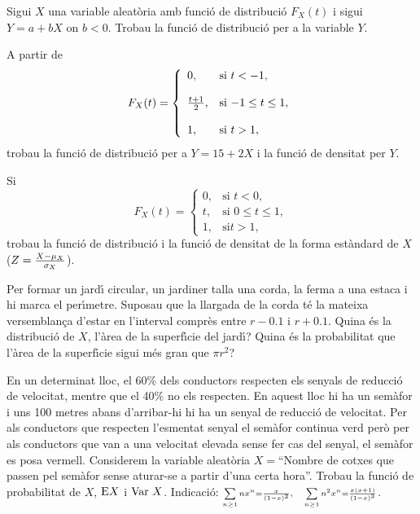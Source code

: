 \begin{prob}
{Sigui $X$ una variable aleat\`oria amb funci\'o de distribuci\'o $F_X(t)$ i
sigui $Y=a+bX$ on $b<0$. Trobau la funci\'o de distribuci\'o per a la variable
$Y$.}
\end{prob}

\begin{prob}
{A partir de 
$$F_X(t)=
\left\{\begin{array}{ll}
0, & \text{si $t<-1$},
\\ & \\
{t+1\over 2}, & \text{si $-1\leq t\leq
1$},
\\ & \\
1, & \text{si $t>1$},
\end{array}\right.$$
trobau la funci\'o de distribuci\'o per a $Y=15+2X$ i la
funci\'o de densitat per $Y$.}
\end{prob}

\begin{prob}
{Si 
$$F_X(t)=
\left\{\begin{array}{ll}
0, & \text{si $t<0$},\\ t, & 
\text{si $0\leq t\leq 1$},\\ 1, & \text{si
$t>1$},
\end{array}\right.
$$
trobau la funci\'o de distribuci\'o i la funci\'o de densitat de la forma
est\`andard de $X$ ($Z={X-\mu_X\over \sigma_X}$).}
\end{prob}

\begin{prob}
{Per formar un jard\'{\i} circular, un jardiner talla una corda, la ferma a
una estaca i hi marca el per\'{\i}metre. Suposau que la llargada de la
corda
t\'e la mateixa versemblan\c{c}a d'estar en l'interval compr\`es entre $r-0.1$
i $r+0.1$. Quina \'es la distribuci\'o de $X$, l'\`area de la superf\'{\i}cie
del jard\'{\i}?
Quina \'es la probabilitat que l'\`area de la superf\'{\i}cie sigui m\'es gran
que
$\pi r^2$?}
\end{prob}

\begin{prob}
{En un determinat lloc, el 60\% dels conductors respecten els senyals
de reducci\'o de velocitat, mentre que el 40\% no els respecten. En aquest
lloc hi ha un sem\`afor i uns 100 metres abans d'arribar-hi hi ha un senyal
de reducci\'o de velocitat. Per als conductors que respecten l'esmentat senyal
el sem\`afor continua verd per\`o per als conductors que van a una velocitat
elevada sense fer cas del senyal, el sem\`afor es posa vermell. 
\newline Considerem la variable aleat\`oria $X=$``Nombre de cotxes que
passen pel sem\`afor sense aturar-se a partir d'una certa hora''.\newline
Trobau la funci\'o de probabilitat de $X$, $\EE X$ i $\hbox{Var }X$.
\newline\hfill 
{\footnotesize Indicaci\'o: }$\scriptstyle \sum\limits_{n\geq 1}n x^n
={x\over {(1-x)}^2},\quad \sum\limits_{n\geq 1}n^2 x^n ={x (x+1)\over
{(1-x)}^3}$.}
\end{prob}

